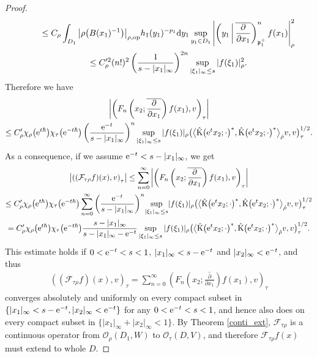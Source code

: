 \documentclass[pdftex]{sigma}
\numberwithin{equation}{section}
\newcommand{\fp}{\mathfrak{p}}
\newcommand{\cF}{\mathcal{F}}
\newcommand{\cO}{\mathcal{O}}
\newcommand{\rK}{\mathrm{K}}
\begin{document}
\begin{proof}
\begin{gather}
\qquad{} \le C_\rho\int_{D_1} \big|\rho\big(B(x_1)^{-1}\big)\big|_{\rho,\mathrm{op}}h_1(y_1)^{-p_1}{\rm d}y_1
\sup_{y_1\in D_1}\left|\left(y_1\,\middle|\,\overline{\frac{\partial}{\partial x_1}}\right)_{\fp^+_1}^nf(x_1)\right|_\rho^2 \notag \\
\qquad{} \le C_\rho^{\prime 2}(n!)^2\left(\frac{1}{s-|x_1|_\infty}\right)^{2n}\sup_{|\xi_1|_\infty\le s}|f(\xi_1)|_\rho^2. \label{higherdiff}
\end{gather}
Therefore we have
\begin{gather*}
 \left|\left(F_n\left(x_2;\overline{\frac{\partial}{\partial x_1}}\right)f(x_1),v\right)_\tau\right| \\
 \le C_\rho'\chi_\rho\big({\rm e}^{t\hbar}\big)\chi_\tau\big({\rm e}^{-t\hbar}\big)
\left(\frac{{\rm e}^{-t}}{s-|x_1|_\infty}\right)^n\sup_{|\xi_1|_\infty\le s}|f(\xi_1)|_\rho
\big(\big\langle\hat{\rK}\big({\rm e}^tx_2;\cdot\big)^*,
\hat{\rK}\big({\rm e}^tx_2;\cdot\big)^*\big\rangle_{\hat{\rho}}v,v\big)_\tau^{1/2}.
\end{gather*}
As a consequence, if we assume ${\rm e}^{-t}<s-|x_1|_\infty$, we get
\begin{gather*}
 \left|\left((\cF_{\tau\rho}f)(x),v\right)_\tau\right|\le\sum_{n=0}^\infty
\left|\left(F_n\left(x_2;\overline{\frac{\partial}{\partial x_1}}\right)f(x_1),v\right)_\tau\right| \\
 \le C_\rho'\chi_\rho\big({\rm e}^{t\hbar}\big)\chi_\tau\big({\rm e}^{-t\hbar}\big)
\sum_{n=0}^\infty \left(\frac{{\rm e}^{-t}}{s-|x_1|_\infty}\right)^n\!\sup_{|\xi_1|_\infty\le s}\!|f(\xi_1)|_\rho
\big(\big\langle\hat{\rK}\big({\rm e}^tx_2;\cdot\big)^* ,
\hat{\rK}\big({\rm e}^tx_2;\cdot\big)^*\big\rangle_{\hat{\rho}}v,v\big)_\tau^{1/2} \\
 =C_\rho'\chi_\rho\big({\rm e}^{t\hbar}\big)\chi_\tau\big({\rm e}^{-t\hbar}\big)\frac{s-|x_1|_\infty}{s-|x_1|_\infty-{\rm e}^{-t}}\sup_{|\xi_1|_\infty\le s}|f(\xi_1)|_\rho
\big(\big\langle\hat{\rK}\big({\rm e}^tx_2;\cdot\big)^*,
\hat{\rK}\big({\rm e}^tx_2;\cdot\big)^*\big\rangle_{\hat{\rho}}v,v\big)_\tau^{1/2}.
\end{gather*}
This estimate holds if $0<{\rm e}^{-t}<s<1$, $|x_1|_\infty<s-{\rm e}^{-t}$ and $|x_2|_\infty<{\rm e}^{-t}$, and thus
\begin{gather*}
 ((\cF_{\tau\rho}f)(x),v )_\tau=\sum_{n=0}^\infty\left(F_n\left(x_2;\overline{\frac{\partial}{\partial x_1}}\right)f(x_1),v\right)_\tau
\end{gather*}
converges absolutely and uniformly on every compact subset in $\{|x_1|_\infty<s-{\rm e}^{-t},|x_2|_\infty<{\rm e}^{-t}\}$ for any $0<{\rm e}^{-t}<s<1$,
and hence also does on every compact subset in $\{|x_1|_\infty+|x_2|_\infty<1\}$.
By Theorem \ref{conti_ext}, $\cF_{\tau\rho}$ is a continuous operator from $\cO_\rho(D_1,W)$ to $\cO_\tau(D,V)$,
and therefore $\cF_{\tau\rho} f(x)$ must extend to whole $D$.
\end{proof}
\end{document}
